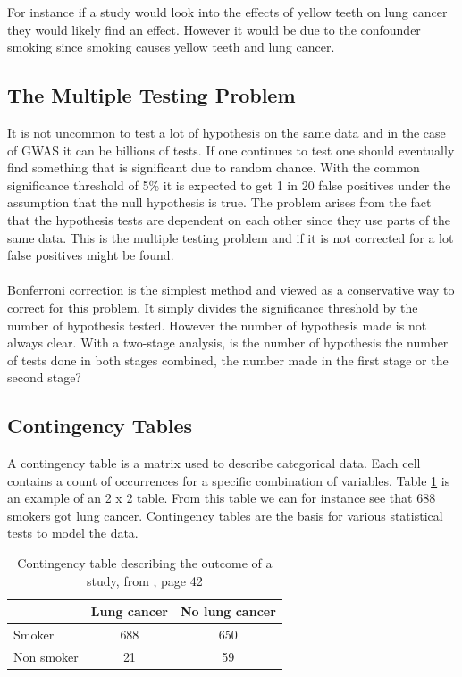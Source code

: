 \documentclass[10pt,a4paper]{report}
\newcounter{example}
\begin{document}
For instance if a study would look into the effects of yellow teeth on lung cancer they would likely find an effect. However it would be due to the confounder smoking since smoking causes yellow teeth and lung cancer. %

\subsection{The Multiple Testing Problem}
It is not uncommon to test a lot of hypothesis on the same data and in the case of GWAS it can be billions of tests. If one continues to test one should eventually find something that is significant due to random chance. With the common significance threshold of 5\% it is expected to get 1 in 20 false positives under the assumption that the null hypothesis is true. The problem arises from the fact that the hypothesis tests are dependent on each other since they use parts of the same data. This is the multiple testing problem and if it is not corrected for a lot false positives might be found.\cite{bonferroni_multiple}\\
\\
Bonferroni correction is the simplest method and viewed as a conservative way to correct for this problem. It simply divides the significance threshold by the number of hypothesis tested. However the number of hypothesis made is not always clear. With a two-stage analysis, is the number of hypothesis the number of tests done in both stages combined, the number made in the first stage or the second stage?\cite{bonferroni_multiple}

\subsection{Contingency Tables}
A contingency table is a matrix used to describe categorical data. Each cell contains a count of occurrences for a specific combination of variables. Table \ref{table:contingency_table} is an example of an 2 x 2 table. From this table we can for instance see that 688 smokers got lung cancer. Contingency tables are the basis for various statistical tests to model the data.\cite{agresti_categorical}

\begin{table}[h]
\begin{tabular}{| l c c |}
  \hline
  & Lung cancer & No lung cancer\\
  \hline
  Smoker & 688 & 650 \\
  Non smoker & 21 & 59 \\
  \hline  
\end{tabular}
\caption{Contingency table describing the outcome of a study, from \cite{agresti_categorical}, page 42}
\label{table:contingency_table}
\end{table}
\end{document}

